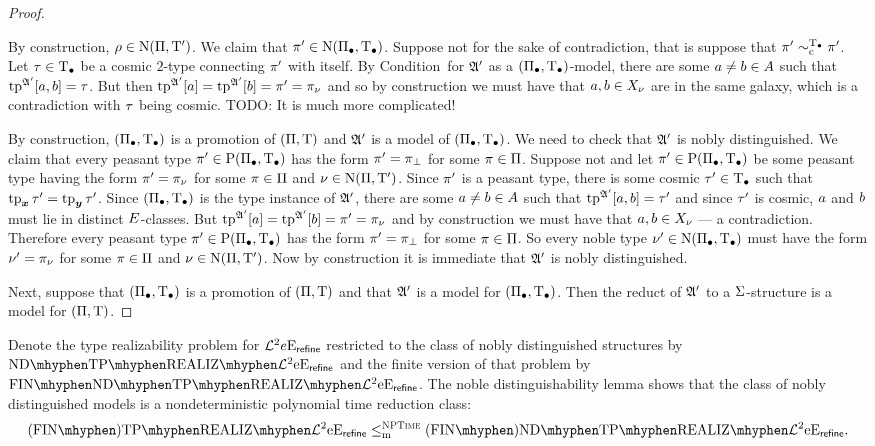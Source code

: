 \begin{proof}
\begin{itemize}
  By construction, $\rho \in \mathrm{\mathrm{N}}(\Pi,{\mathrm{T}'})$. We claim that ${\pi'} \in
  \mathrm{\mathrm{N}}(\Pi_{\bullet},\mathrm{T}_{\bullet})$. Suppose not for the sake of contradiction, that is suppose
  that ${\pi'} \sim_{\mathrm{c}}^{\mathrm{T}_{\bullet}} {\pi'}$. Let $\tau \in \mathrm{T}_{\bullet}$ be a cosmic $2$-type
  connecting ${\pi'}$ with itself. By Condition~\condrealizII for $\mathfrak{A'}$ as a
  $(\Pi_{\bullet},\mathrm{T}_{\bullet})$-model, there are some $a \neq b \in A$ such that
  $\operatorname{tp}^{\mathfrak{A'}}[a,b] = \tau$. But then $\operatorname{tp}^{\mathfrak{A'}}[a] = \operatorname{tp}^{\mathfrak{A'}}[b] =
  {\pi'} = {\pi}_{\nu}$ and so by construction we must have that $a, b
  \in X_\nu$ are in the same galaxy, which is a contradiction with $\tau$
  being cosmic.
  TODO: It is much more complicated!
\end{itemize}

 By
construction, $(\Pi_{\bullet},\mathrm{T}_{\bullet})$ is a promotion of $(\Pi,\mathrm{T})$ and $\mathfrak{A'}$ is a
model of $(\Pi_{\bullet},\mathrm{T}_{\bullet})$.
We need to check that $\mathfrak{A'}$ is nobly distinguished.
We claim that every peasant type ${\pi'} \in \mathrm{P}(\Pi_{\bullet},\mathrm{T}_{\bullet})$ has the form
${\pi'} = {\pi}_{\bot}$ for some $\pi\in\Pi$.
Suppose not and let ${\pi'}\in \mathrm{P}(\Pi_{\bullet},\mathrm{T}_{\bullet})$ be some peasant type having
the form ${\pi'} = {\pi}_{\nu}$ for some $\pi\in\Pi$ and
$\nu\in\mathrm{\mathrm{N}}(\Pi,{\mathrm{T}'})$. 
Since ${\pi'}$ is a peasant type, there is some cosmic ${\tau'} \in \mathrm{T}_{\bullet}$ such
that $\operatorname{tp}_{\bm{x}}{\tau'} = \operatorname{tp}_{\bm{y}}{\tau'}$. Since $(\Pi_{\bullet},\mathrm{T}_{\bullet})$ is the type instance of
$\mathfrak{A'}$, there are some $a \neq b \in A$ such that $\operatorname{tp}^{\mathfrak{A'}}[a,b] = {\tau'}$ and
since ${\tau'}$ is cosmic, $a$ and $b$ must lie in distinct $E$-classes.
But $\operatorname{tp}^{\mathfrak{A'}}[a] = \operatorname{tp}^{\mathfrak{A'}}[b] = {\pi'} = {\pi}_{\nu}$ and by
construction we must have that $a, b \in X_\nu$ --- a contradiction.
Therefore every peasant type ${\pi'} \in \mathrm{P}(\Pi_{\bullet},\mathrm{T}_{\bullet})$ has the form
${\pi'} = {\pi}_{\bot}$ for some $\pi \in \Pi$. So every noble type ${\nu'}
\in \mathrm{\mathrm{N}}(\Pi_{\bullet},\mathrm{T}_{\bullet})$ must have the form ${\nu'} = {\pi}_{\nu}$ for some
$\pi \in \Pi$ and $\nu \in \mathrm{\mathrm{N}}(\Pi,{\mathrm{T}'})$. Now by construction it is
immediate that $\mathfrak{A'}$ is nobly distinguished.

Next, suppose that $(\Pi_{\bullet},\mathrm{T}_{\bullet})$ is a promotion of $(\Pi,\mathrm{T})$ and
that $\mathfrak{A'}$ is a model for $(\Pi_{\bullet},\mathrm{T}_{\bullet})$. Then the reduct of $\mathfrak{A'}$
to a $\mathrm{\Sigma}$-structure is a model for $(\Pi,\mathrm{T})$.
\end{proof}
Denote the type realizability problem for $\mathcal{L}^{2}{e}\mathrm{E}_{\mathsf{refine}}$ restricted to
the class of nobly distinguished structures by $\NDReal{\vFo2\Eea\sze\agrefine}$ and the finite
version of that problem by $\FinNDReal{\vFo2\Eea\sze\agrefine}$.
The noble distinguishability lemma shows that the class of nobly distinguished
models is a nondeterministic polynomial time reduction class:
\[
  \FinAReal{\vFo2\Eea\sze\agrefine} \red{\cNP} \FinANDReal{\vFo2\Eea\sze\agrefine}.
\]

